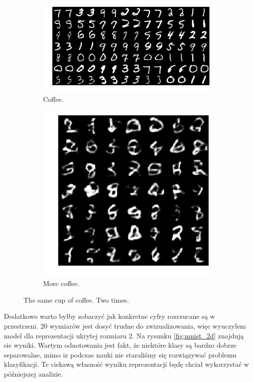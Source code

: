\begin{figure}[h!]
  \centering
  \begin{subfigure}[b]{0.57\linewidth}
    \includegraphics[width=\linewidth]{images/mnist_recon}
    \caption{Coffee.}
  \end{subfigure}
  \begin{subfigure}[b]{0.30\linewidth}
    \includegraphics[width=\linewidth]{images/mnist_gen}
    \caption{More coffee.}
  \end{subfigure}
  \caption{The same cup of coffee. Two times.}
  \label{fig:vae}
\end{figure}

Dodatkowo warto byłby zobaczyć jak konkretne cyfry rozrzucane są w przestrzeni. 20 wymiarów jest dosyć trudne do zwizualizowania, więc wyuczyłem model dla reprezentacji ukrytej rozmiaru 2. Na rysunku \ref{fig:mnist_2d} znajdują sie wyniki. Wartym odnotowania jest fakt, że niektóre klasy są bardzo dobrze separowalne, mimo iz podczas nauki nie staraliśmy się rozwiązywać problemu klasyfikacji. Te ciekawą własność wyniku reprezentacji będę chciał wykorzystać w późniejszej analizie.

